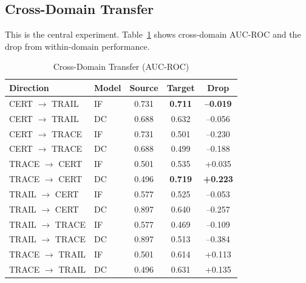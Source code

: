 \documentclass[conference]{IEEEtran}
\begin{document}
\subsection{Cross-Domain Transfer}
\label{sec:transfer}

This is the central experiment. Table~\ref{tab:transfer} shows cross-domain AUC-ROC and the drop from within-domain performance.

\begin{table}[htbp]
\caption{Cross-Domain Transfer (AUC-ROC)}
\label{tab:transfer}
\centering
\small
\begin{tabular}{llccc}
\toprule
\textbf{Direction} & \textbf{Model} & \textbf{Source} & \textbf{Target} & \textbf{Drop} \\
\midrule
CERT $\to$ TRAIL & IF & 0.731 & \textbf{0.711} & \textbf{--0.019} \\
CERT $\to$ TRAIL & DC & 0.688 & 0.632 & --0.056 \\
\addlinespace
CERT $\to$ TRACE & IF & 0.731 & 0.501 & --0.230 \\
CERT $\to$ TRACE & DC & 0.688 & 0.499 & --0.188 \\
\addlinespace
TRACE $\to$ CERT & IF & 0.501 & 0.535 & +0.035 \\
TRACE $\to$ CERT & DC & 0.496 & \textbf{0.719} & \textbf{+0.223} \\
\addlinespace
TRAIL $\to$ CERT & IF & 0.577 & 0.525 & --0.053 \\
TRAIL $\to$ CERT & DC & 0.897 & 0.640 & --0.257 \\
\addlinespace
TRAIL $\to$ TRACE & IF & 0.577 & 0.469 & --0.109 \\
TRAIL $\to$ TRACE & DC & 0.897 & 0.513 & --0.384 \\
\addlinespace
TRACE $\to$ TRAIL & IF & 0.501 & 0.614 & +0.113 \\
TRACE $\to$ TRAIL & DC & 0.496 & 0.631 & +0.135 \\
\bottomrule
\end{tabular}
\end{table}
\end{document}
